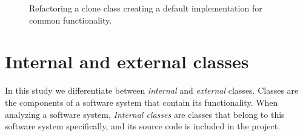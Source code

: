 \begin{figure}[H]
\begin{parcolumns}{2}
\end{parcolumns}
\caption{Refactoring a clone class creating a default implementation for common functionality.}
\label{fig:createinterfaceabstraction}
\end{figure}


\section{Internal and external classes}
In this study we differentiate between \textit{internal} and \textit{external} classes. Classes are the components of a software system that contain its functionality. When analyzing a software system, \textit{Internal classes} are classes that belong to this software system specifically, and its source code is included in the project.

